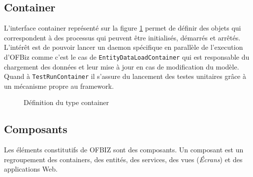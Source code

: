 \subsection{Container}
L'interface container représenté sur la figure \ref{container} permet de définir des objets qui correspondent à des processus qui peuvent être initialisés, démarrés et arrêtés. L'intérêt est de pouvoir lancer un daemon spécifique en parallèle de l'execution d'OFBiz comme c'est le cas de \verb|EntityDataLoadContainer| qui est responsable du chargement des données et leur mise à jour en cas de modification du modèle. Quand à \verb|TestRunContainer| il s'assure du lancement des testes unitaires grâce à un mécanisme propre au framework. 
\begin{figure}[h!]
	\centering
	
	
	\caption{Définition du type container}
	\label{container}
\end{figure}
\subsection{Composants}
Les éléments constitutifs de OFBIZ sont des composants. Un composant est un regroupement des containers, des entités, des services, des vues (\emph{Écrans}) et des applications Web.


